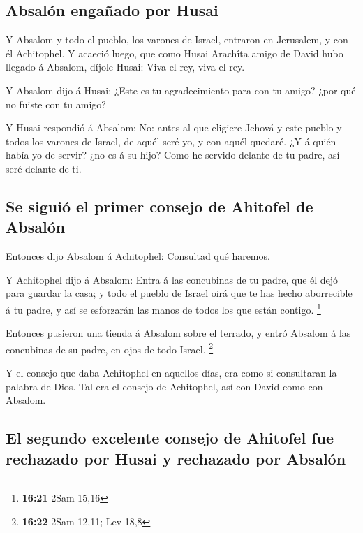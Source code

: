 \hypertarget{absaluxf3n-engauxf1ado-por-husai}{%
\subsection{Absalón engañado por
Husai}\label{absaluxf3n-engauxf1ado-por-husai}}

 Y Absalom y todo el pueblo, los varones de Israel,
entraron en Jerusalem, y con él Achitophel.  Y acaeció
luego, que como Husai Arachîta amigo de David hubo llegado á Absalom,
díjole Husai: Viva el rey, viva el rey.

 Y Absalom dijo á Husai: ¿Este es tu agradecimiento para
con tu amigo? ¿por qué no fuiste con tu amigo?

 Y Husai respondió á Absalom: No: antes al que eligiere
Jehová y este pueblo y todos los varones de Israel, de aquél seré yo, y
con aquél quedaré.  ¿Y á quién había yo de servir? ¿no es á
su hijo? Como he servido delante de tu padre, así seré delante de ti.

\hypertarget{se-siguiuxf3-el-primer-consejo-de-ahitofel-de-absaluxf3n}{%
\subsection{Se siguió el primer consejo de Ahitofel de
Absalón}\label{se-siguiuxf3-el-primer-consejo-de-ahitofel-de-absaluxf3n}}

 Entonces dijo Absalom á Achitophel: Consultad qué haremos.

 Y Achitophel dijo á Absalom: Entra á las concubinas de tu
padre, que él dejó para guardar la casa; y todo el pueblo de Israel oirá
que te has hecho aborrecible á tu padre, y así se esforzarán las manos
de todos los que están contigo. \footnote{\textbf{16:21} 2Sam 15,16}

 Entonces pusieron una tienda á Absalom sobre el terrado, y
entró Absalom á las concubinas de su padre, en ojos de todo Israel.
\footnote{\textbf{16:22} 2Sam 12,11; Lev 18,8}

 Y el consejo que daba Achitophel en aquellos días, era
como si consultaran la palabra de Dios. Tal era el consejo de
Achitophel, así con David como con Absalom.

\hypertarget{el-segundo-excelente-consejo-de-ahitofel-fue-rechazado-por-husai-y-rechazado-por-absaluxf3n}{%
\subsection{El segundo excelente consejo de Ahitofel fue rechazado por
Husai y rechazado por
Absalón}\label{el-segundo-excelente-consejo-de-ahitofel-fue-rechazado-por-husai-y-rechazado-por-absaluxf3n}}


